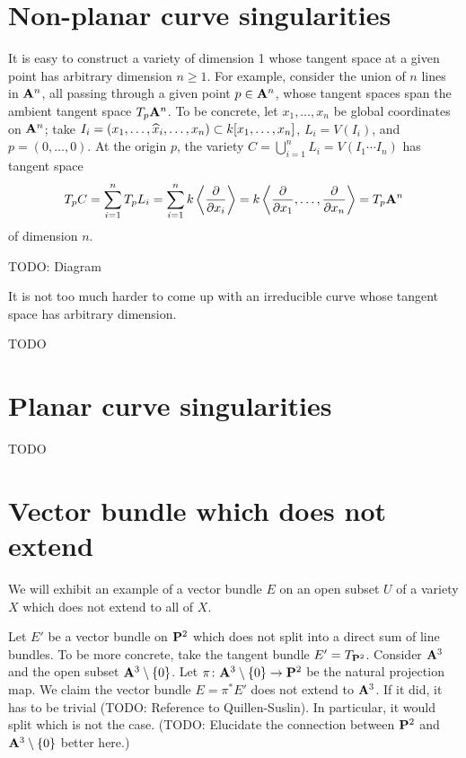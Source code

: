 \section{Non-planar curve singularities}

It is easy to construct a variety of dimension 1 whose tangent space at a given point has arbitrary dimension $n \geq 1$. For example, consider the union of $n$ lines in $\mathbf{A}^n$, all passing through a given point $p \in \mathbf{A}^n$, whose tangent spaces span the ambient tangent space $T_p \mathbf{A}^n$. To be concrete, let $x_1, \dots, x_n$ be global coordinates on $\mathbf{A}^n$; take $I_i = (x_1, \dots, \widehat{x}_i, \dots, x_n) \subset k[x_1, \dots, x_n]$, $L_i = V(I_i)$, and $p = (0, \dots, 0)$. At the origin $p$, the variety $C = \bigcup_{i=1}^n L_i = V(I_1 \cdots I_n)$ has tangent space
\[
T_p C =
\sum_{i=1}^n T_p L_i =
\sum_{i=1}^n k \left\langle \frac{\partial}{\partial x_i} \right\rangle =
k \left\langle \frac{\partial}{\partial x_1}, \dots, \frac{\partial}{\partial x_n} \right\rangle =
T_p \mathbf{A}^n
\]
of dimension $n$.

TODO: Diagram

It is not too much harder to come up with an irreducible curve whose tangent space has arbitrary dimension.



TODO


\section{Planar curve singularities}

TODO


\section{Vector bundle which does not extend}

We will exhibit an example of a vector bundle $E$ on an open subset $U$ of a variety $X$ which does not extend to all of $X$.

Let $E'$ be a vector bundle on $\mathbf{P}^2$ which does not split into a direct sum of line bundles. To be more concrete, take the tangent bundle $E' = T_{\mathbf{P}^2}$. Consider $\mathbf{A}^3$ and the open subset $\mathbf{A}^3 \setminus \{0\}$. Let $\pi \cn \Abb^3 \setminus \{0\} \rarr \Pbb^2$ be the natural projection map. We claim the vector bundle $E = \pi^\ast E'$ does not extend to $\mathbf{A}^3$. If it did, it has to be trivial (TODO: Reference to Quillen-Suslin). In particular, it would split which is not the case. (TODO: Elucidate the connection between $\mathbf{P}^2$ and $\mathbf{A}^3 \setminus \{0\}$ better here.)

